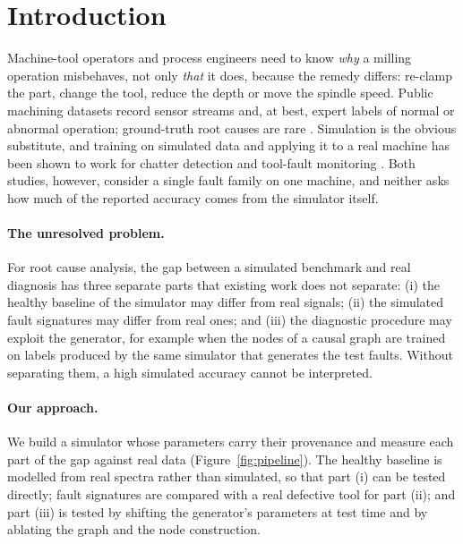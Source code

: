 \documentclass[11pt]{article}
\begin{document}
\section{Introduction}
Machine-tool operators and process engineers need to know \emph{why} a milling operation misbehaves, not only \emph{that} it does, because the remedy differs: re-clamp the part, change the tool, reduce the depth or move the spindle speed.
Public machining datasets record sensor streams and, at best, expert labels of normal or abnormal operation; ground-truth root causes are rare \citep{kim2026msm}.
Simulation is the obvious substitute, and training on simulated data and applying it to a real machine has been shown to work for chatter detection \citep{alberts2024sim2real} and tool-fault monitoring \citep{ebrahimi2023smartfaults}.
Both studies, however, consider a single fault family on one machine, and neither asks how much of the reported accuracy comes from the simulator itself.

\paragraph{The unresolved problem.}
For root cause analysis, the gap between a simulated benchmark and real diagnosis has three separate parts that existing work does not separate: (i) the healthy baseline of the simulator may differ from real signals; (ii) the simulated fault signatures may differ from real ones; and (iii) the diagnostic procedure may exploit the generator, for example when the nodes of a causal graph are trained on labels produced by the same simulator that generates the test faults.
Without separating them, a high simulated accuracy cannot be interpreted.

\paragraph{Our approach.}
We build a simulator whose parameters carry their provenance and measure each part of the gap against real data (Figure~\ref{fig:pipeline}).
The healthy baseline is modelled from real spectra rather than simulated, so that part (i) can be tested directly; fault signatures are compared with a real defective tool for part (ii); and part (iii) is tested by shifting the generator's parameters at test time and by ablating the graph and the node construction.
\end{document}
